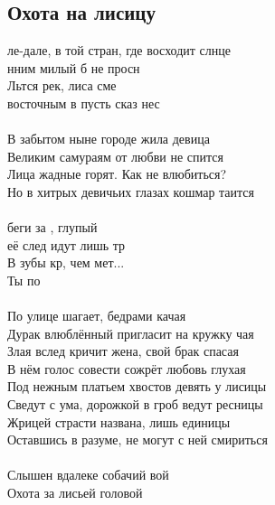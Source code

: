 \documentclass[fleqn,a5paper,12pt,twoside]{guitartabs}
\begin{document}
\subsection*{Охота на лисицу}
    ле-дале, в той стран, где восходит слнце\\
    нним  милый б не просн\\
    Льтся  рек, лиса сме\\
     восточным в пусть сказ нес\\
    \\
    В забытом ныне городе жила девица\\
    Великим самураям от любви не спится\\
    Лица жадные горят. Как не влюбиться?\\
    Но в хитрых девичьих глазах кошмар таится\\
    \\
    \-\hspace{10mm} беги за , глупый\\
    \-\hspace{10mm} её след идут лишь тр\\
    \-\hspace{10mm}В зубы кр, чем мет...\\
    \-\hspace{10mm}Ты по\\
    \\
    По улице шагает, бедрами качая\\
    Дурак влюблённый пригласит на кружку чая\\
    Злая вслед кричит жена, свой брак спасая\\
    В нём голос совести сожрёт любовь глухая\\
    \newpage
    Под нежным платьем хвостов девять у лисицы\\
    Сведут с ума, дорожкой в гроб ведут ресницы\\
    Жрицей страсти названа, лишь единицы\\
    Оставшись в разуме, не могут с ней смириться\\
    \\
    \-\hspace{10mm}Слышен вдалеке собачий вой\\
    \-\hspace{10mm}Охота за лисьей головой\\
\end{document}
